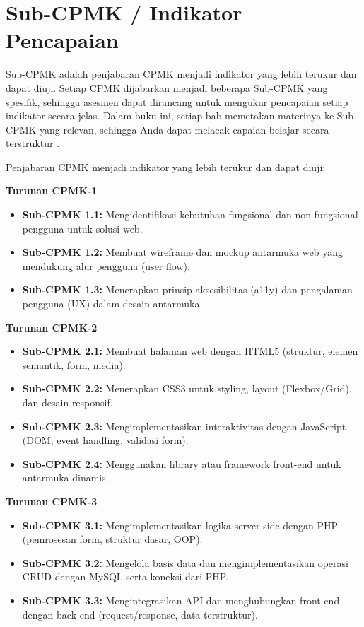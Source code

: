 \section{Sub-CPMK / Indikator Pencapaian}

Sub-CPMK adalah penjabaran CPMK menjadi indikator yang lebih terukur dan dapat diuji. Setiap CPMK dijabarkan menjadi beberapa Sub-CPMK yang spesifik, sehingga asesmen dapat dirancang untuk mengukur pencapaian setiap indikator secara jelas. Dalam buku ini, setiap bab memetakan materinya ke Sub-CPMK yang relevan, sehingga Anda dapat melacak capaian belajar secara terstruktur \cite{mdnLearn}.

Penjabaran CPMK menjadi indikator yang lebih terukur dan dapat diuji:

\textbf{Turunan CPMK-1}
\begin{itemize}[leftmargin=*]
  \item \textbf{Sub-CPMK 1.1:} Mengidentifikasi kebutuhan fungsional dan non-fungsional pengguna untuk solusi web.
  \item \textbf{Sub-CPMK 1.2:} Membuat wireframe dan mockup antarmuka web yang mendukung alur pengguna (user flow).
  \item \textbf{Sub-CPMK 1.3:} Menerapkan prinsip aksesibilitas (a11y) dan pengalaman pengguna (UX) dalam desain antarmuka.
\end{itemize}

\textbf{Turunan CPMK-2}
\begin{itemize}[leftmargin=*]
  \item \textbf{Sub-CPMK 2.1:} Membuat halaman web dengan HTML5 (struktur, elemen semantik, form, media).
  \item \textbf{Sub-CPMK 2.2:} Menerapkan CSS3 untuk styling, layout (Flexbox/Grid), dan desain responsif.
  \item \textbf{Sub-CPMK 2.3:} Mengimplementasikan interaktivitas dengan JavaScript (DOM, event handling, validasi form).
  \item \textbf{Sub-CPMK 2.4:} Menggunakan library atau framework front-end untuk antarmuka dinamis.
\end{itemize}

\textbf{Turunan CPMK-3}
\begin{itemize}[leftmargin=*]
  \item \textbf{Sub-CPMK 3.1:} Mengimplementasikan logika server-side dengan PHP (pemrosesan form, struktur dasar, OOP).
  \item \textbf{Sub-CPMK 3.2:} Mengelola basis data dan mengimplementasikan operasi CRUD dengan MySQL serta koneksi dari PHP.
  \item \textbf{Sub-CPMK 3.3:} Mengintegrasikan API dan menghubungkan front-end dengan back-end (request/response, data terstruktur).
\end{itemize}

